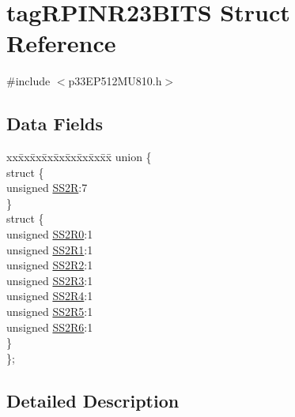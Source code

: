 \hypertarget{structtag_r_p_i_n_r23_b_i_t_s}{}\section{tag\+R\+P\+I\+N\+R23\+B\+I\+TS Struct Reference}
\label{structtag_r_p_i_n_r23_b_i_t_s}


{\ttfamily \#include $<$p33\+E\+P512\+M\+U810.\+h$>$}

\subsection*{Data Fields}
\begin{DoxyCompactItemize}
\item 
\begin{tabbing}
xx\=xx\=xx\=xx\=xx\=xx\=xx\=xx\=xx\=\kill
union \{\\
\>struct \{\\
\>\>unsigned \hyperlink{structtag_r_p_i_n_r23_b_i_t_s_ad0753cb30d29b2c575eccd59320b21c8}{SS2R}:7\\
\>\} \\
\>struct \{\\
\>\>unsigned \hyperlink{structtag_r_p_i_n_r23_b_i_t_s_a828f83bcf3ade3fd73b60ca86c283463}{SS2R0}:1\\
\>\>unsigned \hyperlink{structtag_r_p_i_n_r23_b_i_t_s_a64eb0df1ecfccc358591d18d330c2f7d}{SS2R1}:1\\
\>\>unsigned \hyperlink{structtag_r_p_i_n_r23_b_i_t_s_a04840d6d7770f68e082f8174c57e3186}{SS2R2}:1\\
\>\>unsigned \hyperlink{structtag_r_p_i_n_r23_b_i_t_s_a2a4847a85550359c9069ae2ec5d3011e}{SS2R3}:1\\
\>\>unsigned \hyperlink{structtag_r_p_i_n_r23_b_i_t_s_ae8a50a548cd45377f9a65fe6889174ea}{SS2R4}:1\\
\>\>unsigned \hyperlink{structtag_r_p_i_n_r23_b_i_t_s_a336267ad9233ae6657a70797f569b47e}{SS2R5}:1\\
\>\>unsigned \hyperlink{structtag_r_p_i_n_r23_b_i_t_s_a0a6df35bc166904f6a4a6bafa5f99edd}{SS2R6}:1\\
\>\} \\
\}; \\

\end{tabbing}\end{DoxyCompactItemize}


\subsection{Detailed Description}


